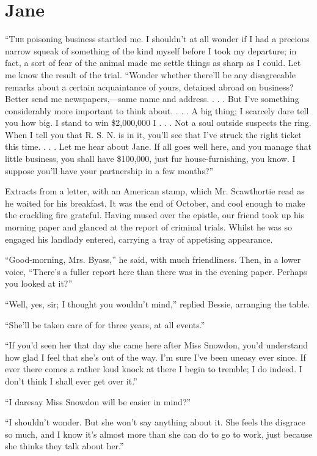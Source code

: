 \chapter{Jane}

\textsc{``The} poisoning business startled me. I shouldn't at all wonder
if I had a precious narrow squeak of something of the kind myself before
I took my departure; in fact, a sort of fear of the animal made me
settle things as sharp as I could. Let me know the result of the trial.
``Wonder whether there'll be any disagreeable remarks about a certain
acquaintance of yours, detained abroad on business? Better send me
newspapers,---same name and address. . . . But I've something
considerably more important to think about. . . . A big thing; I
scarcely dare tell you how big. I stand to win \$2,000,000 I . . . Not a
soul outside suspects the ring. When I tell you that R. S. N. is in it,
you'll see that I've struck the right ticket this time. . . . Let me
hear about Jane. If all goes well here, and you manage that little
business, you shall have \$100,000, just fur {}house-furnishing, you
know. I suppose you'll have your partnership in a few months?''

Extracts from a letter, with an American stamp, which Mr. Scawthortie
read as he waited for his breakfast. It was the end of October, and cool
enough to make the crackling fire grateful. Having mused over the
epistle, our friend took up his morning paper and glanced at the report
of criminal trials. Whilst he was so engaged his landlady entered,
carrying a tray of appetising appearance.

``Good-morning, Mrs. Byass,'' he said, with much friendliness. Then, in
a lower voice, ``There's a fuller report here than there was in the
evening paper. Perhaps you looked at it?''

``Well, yes, sir; I thought you wouldn't mind,'' replied Bessie,
arranging the table.

``She'll be taken care of for three years, at all events.''

``If you'd seen her that day she came here after Miss Snowdon, you'd
understand how glad I feel that she's out of the way. I'm sure I've been
uneasy ever since. If ever there comes a rather loud knock at there I
begin to tremble; I do indeed. I don't think I shall ever get over it.''

{}``I daresay Miss Snowdon will be easier in mind?''

``I shouldn't wonder. But she won't say anything about it. She feels the
disgrace so much, and I know it's almost more than she can do to go to
work, just because she thinks they talk about her.''

